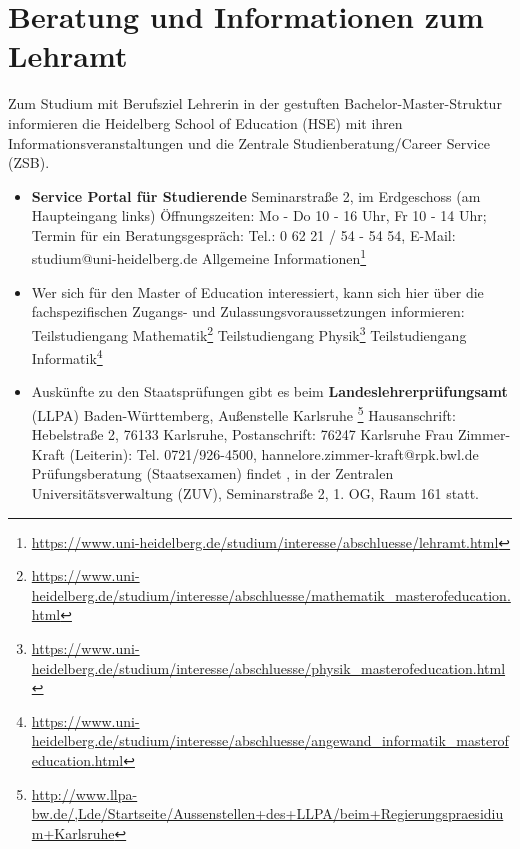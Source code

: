 \section{Beratung und Informationen zum Lehramt}

Zum Studium mit Berufsziel Lehrerin in der gestuften Bachelor-Master-Struktur informieren die Heidelberg School of Education (HSE) mit ihren Informationsveranstaltungen und die Zentrale Studienberatung/Career Service (ZSB).
\begin{itemize}
\item \textbf{Service Portal für Studierende} \newline
    Seminarstraße 2, im Erdgeschoss (am Haupteingang links)
    Öffnungszeiten: Mo - Do 10 - 16 Uhr, Fr 10 - 14 Uhr; \newline
    Termin für ein Beratungsgespräch: Tel.: 0 62 21 / 54 - 54 54, E-Mail: studium@uni-heidelberg.de \newline
    Allgemeine Informationen\footnote{\url{https://www.uni-heidelberg.de/studium/interesse/abschluesse/lehramt.html}}

\item Wer sich für den Master of Education interessiert, kann sich hier über die fachspezifischen Zugangs- und Zulassungsvoraussetzungen informieren: \newline
    Teilstudiengang Mathematik\footnote{\url{https://www.uni-heidelberg.de/studium/interesse/abschluesse/mathematik_masterofeducation.html}} \newline
    Teilstudiengang Physik\footnote{\url{https://www.uni-heidelberg.de/studium/interesse/abschluesse/physik_masterofeducation.html}}
    Teilstudiengang Informatik\footnote{\url{https://www.uni-heidelberg.de/studium/interesse/abschluesse/angewand_informatik_masterofeducation.html}}

\item Auskünfte zu den Staatsprüfungen gibt es beim \textbf{Landeslehrerprüfungsamt} (LLPA) Baden-Württemberg, Außenstelle Karlsruhe \footnote{\url{http://www.llpa-bw.de/,Lde/Startseite/Aussenstellen+des+LLPA/beim+Regierungspraesidium+Karlsruhe}} \newline
    Hausanschrift: Hebelstraße 2, 76133 Karlsruhe, Postanschrift: 76247 Karlsruhe \newline
    Frau Zimmer-Kraft (Leiterin): Tel. 0721/926-4500, hannelore.zimmer-kraft@rpk.bwl.de \newline
    Prüfungsberatung (Staatsexamen) findet \beratungpaedagogik, in der Zentralen Universitätsverwaltung (ZUV), Seminarstraße 2, 1. OG, Raum 161 statt.


\end{itemize}
